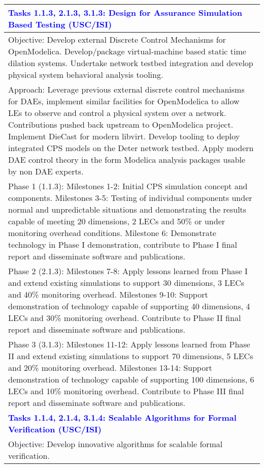 {\begin{longtable} {|p{\textwidth} | }
\textcolor{blue} {\footnotesize {\textbf{Tasks 1.1.3, 2.1.3, 3.1.3: Design for Assurance Simulation Based Testing (USC/ISI)}}} \\ \hline
Objective:  Develop external Discrete Control Mechanisms for OpenModelica.  Develop/package virtual-machine based static time dilation systems. Undertake network testbed integration and develop physical system behavioral analysis tooling. \\ \hline
Approach:  Leverage previous external discrete control mechanisms for DAEs, implement similar facilities for OpenModelica to allow LEs to observe and control a physical system over a network. Contributions pushed back upstream to OpenModelica project.  Implement DieCast for modern libvirt.  Develop tooling to deploy integrated CPS models on the Deter network testbed. Apply modern DAE control theory in the form Modelica analysis packages usable by non DAE experts. \\ \hline
Phase 1 (1.1.3):  Milestones 1-2:  Initial CPS simulation concept and components.  Milestones 3-5:  Testing of individual components under normal and unpredictable situations and demonstrating the results capable of meeting 20 dimensions, 2 LECs and 50\% or under monitoring overhead conditions.   Milestone 6: Demonstrate technology in Phase I demonstration, contribute to Phase I final report and disseminate software and publications. \\ \hline
Phase 2 (2.1.3):  Milestones 7-8:  Apply lessons learned from Phase I and extend existing simulations to support 30 dimensions, 3 LECs and 40\% monitoring overhead.  Milestones 9-10:  Support demonstration of technology capable of supporting 40 dimensions, 4 LECs and 30\% monitoring overhead.  Contribute to Phase II final report and disseminate software and publications. \\ \hline
Phase 3 (3.1.3):  Milestones 11-12:  Apply lessons learned from Phase II and extend existing simulations to support 70 dimensions, 5 LECs and 20\% monitoring overhead.  Milestones 13-14:  Support demonstration of technology capable of supporting 100 dimensions, 6 LECs and 10\% monitoring overhead.  Contribute to Phase III final report and disseminate software and publications. \\ \hline
\textcolor{blue} {\footnotesize {\textbf{Tasks 1.1.4, 2.1.4, 3.1.4: Scalable Algorithms for Formal Verification (USC/ISI)}}} \\ \hline
Objective: Develop innovative algorithms for scalable formal verification. \\ \hline

\end{longtable}}

